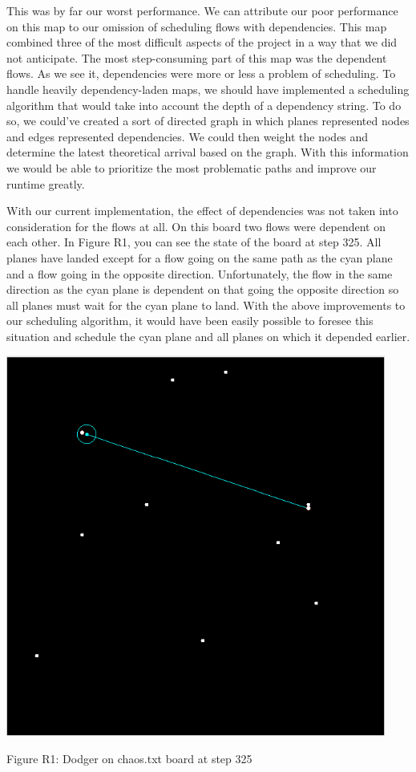 \documentclass[10pt]{article}
\begin{document}
This was by far our worst performance. We can attribute our poor performance on this map to our omission of scheduling flows with dependencies. This map combined three of the most difficult aspects of the project in a way that we did not anticipate. The most step-consuming part of this map was the dependent flows. As we see it, dependencies were more or less a problem of scheduling. To handle heavily dependency-laden maps, we should have implemented a scheduling algorithm that would take into account the depth of a dependency string. To do so, we could’ve created a sort of directed graph in which planes represented nodes and edges represented dependencies. We could then weight the nodes and determine the latest theoretical arrival based on the graph. With this information we would be able to prioritize the most problematic paths and improve our runtime greatly.

With our current implementation, the effect of dependencies was not taken into consideration for the flows at all. On this board two flows were dependent on each other. In Figure R1, you can see the state of the board at step 325. All planes have landed except for a flow going on the same path as the cyan plane and a flow going in the opposite direction. Unfortunately, the flow in the same direction as the cyan plane is dependent on that going the opposite direction so all planes must wait for the cyan plane to land. With the above improvements to our scheduling algorithm, it would have been easily possible to foresee this situation and schedule the cyan plane and all planes on which it depended earlier. 

\includegraphics[width=125mm]{pics/R1.png}
\caption{Figure R1: Dodger on chaos.txt board at step 325}
\end{document}
